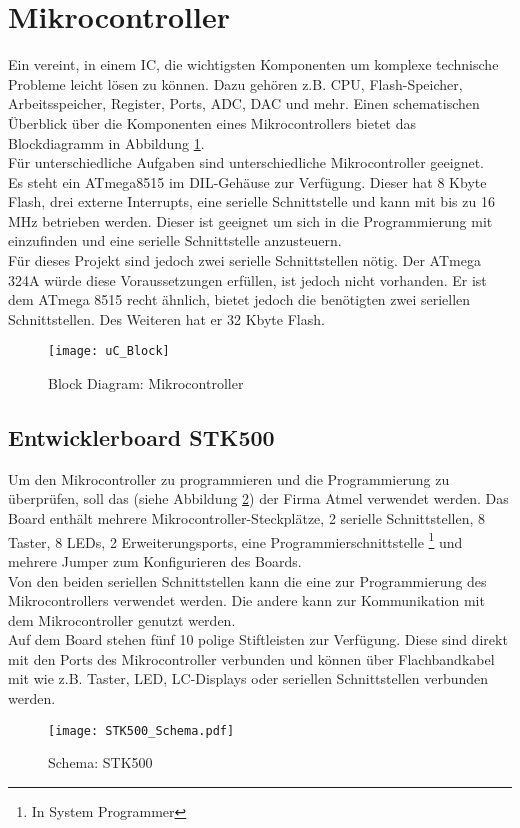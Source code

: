 \section{Mikrocontroller}
\label{sec:Mikrocontroller}
Ein  vereint, in einem IC, die wichtigsten Komponenten um komplexe technische Probleme leicht lösen zu können. Dazu gehören z.B. CPU, Flash-Speicher, Arbeitsspeicher, Register, Ports, ADC, DAC und mehr. Einen schematischen Überblick über die Komponenten eines Mikrocontrollers bietet das Blockdiagramm in Abbildung \ref{fig:uC_Blockdiagramm}. \\
Für unterschiedliche Aufgaben sind unterschiedliche Mikrocontroller geeignet.\\
Es steht ein ATmega8515 \cite{atmel:8515} im DIL-Gehäuse zur Verfügung. Dieser hat 8 Kbyte Flash, drei externe Interrupts, eine serielle Schnittstelle und kann mit bis zu 16 MHz betrieben werden. 
Dieser ist geeignet um sich in die Programmierung mit  einzufinden und eine serielle Schnittstelle anzusteuern. \\
Für dieses Projekt sind jedoch zwei serielle Schnittstellen nötig. Der ATmega 324A \cite{atmel:324A} würde diese Voraussetzungen erfüllen, ist jedoch nicht vorhanden. Er ist dem ATmega 8515 recht ähnlich, bietet jedoch die benötigten zwei seriellen Schnittstellen. Des Weiteren hat er 32 Kbyte Flash. 
\begin{figure}[htb]
\centering
\texttt{[image: uC\_Block]}
\caption{Block Diagram: Mikrocontroller}
\label{fig:uC_Blockdiagramm}
\citep{atmel:ug_324A}
\end{figure}

\subsection{Entwicklerboard STK500}
\label{sec:STK500}
Um den Mikrocontroller zu programmieren und die Programmierung zu überprüfen, soll das (siehe Abbildung \ref{fig:STK500}) der Firma Atmel verwendet werden. Das Board enthält mehrere Mikrocontroller-Steckplätze, 2 serielle Schnittstellen, 8 Taster, 8 LEDs, 2 Erweiterungsports, eine Programmierschnittstelle \footnote{In System Programmer} und mehrere Jumper zum Konfigurieren des Boards.\\
Von den beiden seriellen Schnittstellen kann die eine zur Programmierung des Mikrocontrollers verwendet werden. Die andere kann zur Kommunikation mit dem Mikrocontroller genutzt werden.\\
Auf dem Board stehen fünf 10 polige Stiftleisten 
zur Verfügung. Diese sind direkt mit den Ports des Mikrocontroller verbunden und können über Flachbandkabel mit  wie z.B. Taster, LED, LC-Displays oder seriellen Schnittstellen verbunden werden.
\begin{figure}[htb]
\centering
\texttt{[image: STK500\_Schema.pdf]}
\caption{Schema: STK500}
\label{fig:STK500}
\citep{atmel:ug_STK500}
\end{figure}


